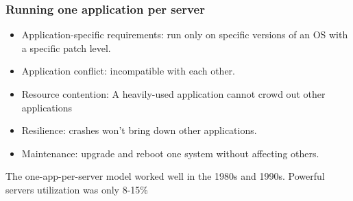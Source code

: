 \begin{frame}
\frametitle{Running one application per server}
\begin{itemize}
    \item \alert{Application-specific requirements:} run only on specific versions of an OS with a specific patch level. 
    \item \alert{Application conflict:}  incompatible with each other.
    \item \alert{Resource contention:} A heavily-used application cannot crowd out other applications
    \item \alert{Resilience:} crashes won't bring down other applications.
    \item \alert{Maintenance:} upgrade and reboot one system without affecting others.
\end{itemize}
The one-app-per-server model worked well in the 1980s and 1990s.  Powerful servers  utilization was only 8-15\% 
\end{frame}
